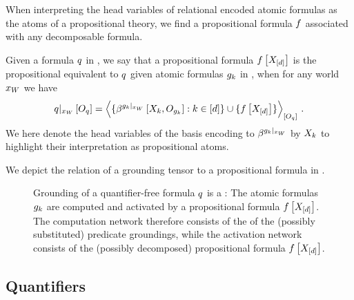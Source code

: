 When interpreting the head variables of relational encoded atomic formulas as the atoms of a propositional theory, we find a propositional formula $f$ associated with any decomposable \firstOrderLogic{} formula.

\begin{definition}
    \label{def:propositionalEquivalent}
    Given a formula $q$ in \firstOrderLogic{}, we say that a propositional formula $f\left[X_{[d]}\right]$ is the propositional equivalent to $q$ given atomic formulas $g_{k}$ in \firstOrderLogic{}, when for any world $x_{W}$ we have
    \begin{align*}
        \groundingofat{\folexformula}{\indvariableof{\folexformula}}
        = \contractionof{
            \{\bencodingofat{\groundingof{\extformulaof{\atomenumerator}}}{\catvariableof{\atomenumerator},\indvariableof{\extformulaof{\atomenumerator}}} : \atomenumeratorin\}
            \cup \{\formulaat{\shortcatvariables}\}
        }{\indvariableof{\folexformula}} \, .
    \end{align*}
    We here denote the head variables of the basis encoding to $\beta^{{g_{k}}|_{x_{W}}}$ by $X_{k}$ to highlight their interpretation as propositional atoms.
\end{definition}

We depict the relation of a grounding tensor to a propositional formula in .

\begin{figure}
    
    \caption{
        Grounding of a quantifier-free \firstOrderLogic{} formula $q$ is a \ComputationActivationNetwork{}:
        The atomic formulas $g_{k}$ are computed and activated by a propositional formula $f\left[X_{[d]}\right]$.
        The computation network therefore consists of the of the (possibly substituted) predicate groundings, while the activation network consists of the (possibly decomposed) propositional formula $f\left[X_{[d]}\right]$.
    }\label{fig:comActRepFOLgrounding}
\end{figure}



\subsection{Quantifiers}

